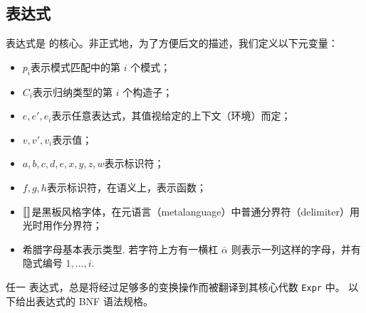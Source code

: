 \documentclass[a4paper, 11pt]{article}
\theoremstyle{remark}\newtheorem*{remark}{Remark}
\theoremstyle{definition}\newtheorem*{definition}{Definition}
\begin{document}
\subsection{表达式}
表达式是 \Tigris 的核心。非正式地，为了方便后文的描述，我们定义以下元变量：
\begin{itemize}
  \item \(p_i\)\quad 表示模式匹配中的第 \(i\) 个模式；
  \item \(C_i\)\quad 表示归纳类型的第 $i$ 个构造子；
  \item \(e, e', e_i\)\quad 表示任意表达式，其值视给定的上下文（环境）而定；
  \item \(v, v', v_i\)\quad 表示值；
  \item \(a, b, c, d, e, x, y, z, w\)\quad 表示标识符；
  \item \(f, g, h\)\quad 表示标识符，在语义上，表示函数；
  \item \(\llbracket  \rrbracket\)\quad 是黑板风格字体，在元语言（metalanguage）中普通分界符（delimiter）用光时用作分界符；
  \item 希腊字母\quad 基本表示类型. 若字符上方有一横杠 \(\bar{\alpha}\) 则表示一列这样的字母，并有隐式编号 \(1,\dots,i\).
\end{itemize}
任一 \Tigris 表达式，总是将经过足够多的变换操作而被翻译到其核心代数 \texttt{Expr} 中。
以下给出表达式的 BNF 语法规格。
\end{document}
